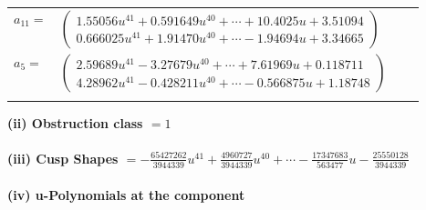 \documentclass[1p]{elsarticle_modified}
\theoremstyle{definition}
\begin{document}
\begin{tabular}{m{7pt} m{180pt} m{7pt} m{180pt} }
\flushright $a_{11}=$&$\begin{pmatrix}1.55056 u^{41}+0.591649 u^{40}+\cdots+10.4025 u+3.51094\\0.666025 u^{41}+1.91470 u^{40}+\cdots-1.94694 u+3.34665\end{pmatrix}$ \\
\flushright $a_{5}=$&$\begin{pmatrix}2.59689 u^{41}-3.27679 u^{40}+\cdots+7.61969 u+0.118711\\4.28962 u^{41}-0.428211 u^{40}+\cdots-0.566875 u+1.18748\end{pmatrix}$\\&\end{tabular}
\flushleft \textbf{(ii) Obstruction class $= 1$}\\~\\
\flushleft \textbf{(iii) Cusp Shapes $= -\frac{65427262}{3944339} u^{41}+\frac{4960727}{3944339} u^{40}+\cdots-\frac{17347683}{563477} u-\frac{25550128}{3944339}$}\\~\\
\newpage\renewcommand{\arraystretch}{1}
\flushleft \textbf{(iv) u-Polynomials at the component}\newline \\
\end{document}
